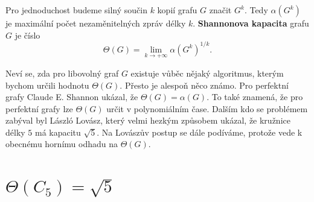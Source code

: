 Pro jednoduchost budeme silný součin $k$ kopií grafu $G$ značit $G^k$. Tedy $\alpha(G^k)$ je maximální počet nezaměnitelných zpráv délky $k$. \textbf{Shannonova kapacita} grafu $G$ je číslo
$$
    \Theta(G) = \lim_{k \rightarrow +\infty} \alpha(G^k)^{1/k}.
$$

Neví se, zda pro libovolný graf $G$ existuje vůběc nějaký algoritmus, kterým bychom určili hodnotu $\Theta(G)$. Přesto je alespoň něco známo. Pro perfektní grafy Claude E. Shannon ukázal, že $\Theta(G) = \alpha(G)$. To také znamená, že pro perfektní grafy lze $\Theta(G)$ určit v polynomiálním čase. Dalším kdo se problémem zabýval byl László Lovász, který velmi hezkým způsobem ukázal, že kružnice délky $5$ má kapacitu $\sqrt{5}$. Na Lovászův postup se dále podíváme, protože vede k obecnému hornímu odhadu na $\Theta(G)$.

\section{$\Theta(C_5) = \sqrt{5}$}
